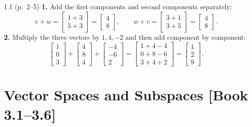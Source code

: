 \documentclass[11pt,a4paper,openany,oneside]{book}
\def\vect#1{#1}%
\def\mathbf#1{#1}%
\def\bk#1{ [Book #1]}%
\newcommand{\vect}[1]{\mathbf{#1}}
\numberwithin{equation}{chapter}
\newcommand{\bk}[1]{\texorpdfstring{\enspace{\normalfont\small\color{slate}[Book #1]}}{ [Book #1]}}
\begin{document}
\vfill
\begin{pageend_sol}{1.1 (p.\ 2--5)}
\textbf{1.} Add the first components and second components separately:
\[
\vect{v}+\vect{w} = \begin{bmatrix} 1+3 \\ 5+3 \end{bmatrix} = \begin{bmatrix} 4 \\ 8 \end{bmatrix}, \qquad \vect{w}+\vect{v} = \begin{bmatrix} 3+1 \\ 3+5 \end{bmatrix} = \begin{bmatrix} 4 \\ 8 \end{bmatrix}.
\]
\textbf{2.} Multiply the three vectors by $1, 4, -2$ and then add component by component:
\[
\begin{bmatrix} 1 \\ 0 \\ 3 \end{bmatrix} + \begin{bmatrix} 4 \\ 8 \\ 4 \end{bmatrix} + \begin{bmatrix} -4 \\ -6 \\ 2 \end{bmatrix} = \begin{bmatrix} 1 + 4 - 4 \\ 0 + 8 - 6 \\ 3 + 4 + 2 \end{bmatrix} = \begin{bmatrix} 1 \\ 2 \\ 9 \end{bmatrix}.
\]
\end{pageend_sol}
\clearpage

\chapter[Vector Spaces and Subspaces (3.1--3.6)]{Vector Spaces and Subspaces\bk{3.1--3.6}}
\end{document}
